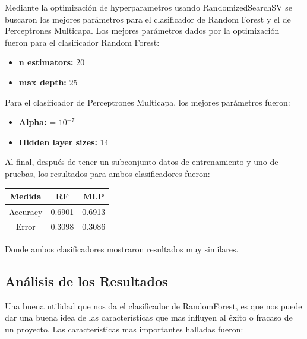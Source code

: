 \documentclass[journal]{IEEEtran}
\begin{document}
Mediante la optimización de hyperparametros usando RandomizedSearchSV se buscaron los mejores parámetros para el clasificador de Random Forest y el de Perceptrones Multicapa. Los mejores parámetros dados por la optimización fueron para el clasificador Random Forest:

\begin{itemize}
	\item \textbf{n estimators:} 20
	\item \textbf{max depth:} 25
\end{itemize}

Para el clasificador de Perceptrones Multicapa, los mejores parámetros fueron:
\begin{itemize}
	\item \textbf{Alpha:} = $10^{-7}$
	\item \textbf{Hidden layer sizes:} 14
\end{itemize}

Al final, después de tener un subconjunto datos de entrenamiento y uno de pruebas, los resultados para ambos clasificadores fueron:

\begin{center}
 \begin{tabular}{||c c c||} 
 \hline
 Medida & RF & MLP \\ [0.5ex] 
 \hline\hline
 Accuracy & 0.6901 & 0.6913 \\ 
 \hline
 Error & 0.3098 & 0.3086 \\[1ex] 
 \hline
\end{tabular}
\end{center}

Donde ambos clasificadores mostraron resultados muy similares.

\subsection{Análisis de los Resultados}
Una buena utilidad que nos da el clasificador de RandomForest, es que nos puede dar una buena idea de las características que mas influyen al éxito o fracaso de un proyecto. Las características mas importantes halladas fueron:
\end{document}
